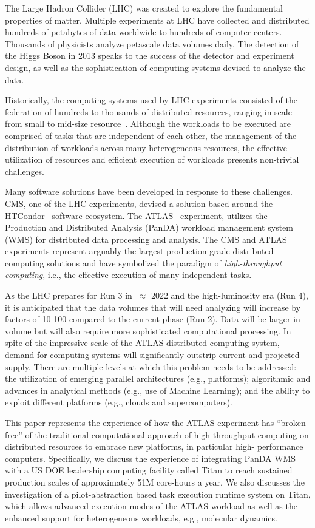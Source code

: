 The Large Hadron Collider (LHC) was created to explore the fundamental
properties of matter. Multiple experiments at LHC have
collected and distributed hundreds of petabytes of data worldwide to hundreds of
computer centers. Thousands of physicists analyze petascale data volumes daily.
The detection of the Higgs Boson in 2013 speaks to the success of the detector
and experiment design, as well as the sophistication of computing systems
devised to analyze the data.

Historically, the computing systems used by LHC experiments consisted of the
federation of hundreds to thousands of distributed resources, %
ranging in scale from small to mid-size resource~\cite{foster2003grid}. Although
the workloads to be executed are comprised of tasks that are independent of each
other, the management of the distribution of workloads across many heterogeneous
resources, the effective utilization of resources and efficient
execution of workloads presents non-trivial challenges.

Many software solutions have been developed in response to these challenges.
CMS, one of the LHC experiments, devised a solution based around the
HTCondor~\cite{thain2005distributed} software ecosystem. The
ATLAS~\cite{Aad:2008} experiment, utilizes the Production and Distributed
Analysis (PanDA) workload management system~\cite{Maeno2011} (WMS) for
distributed data processing and analysis. The CMS and ATLAS experiments
represent arguably the largest production grade distributed computing solutions
and have symbolized the paradigm of {\it high-throughput computing}, i.e., the
effective execution of many independent tasks.

As the LHC prepares for Run 3 in $~\approx$ 2022 and the high-luminosity era
(Run 4), it is anticipated that the data volumes that will need analyzing will
increase by factors of 10-100 compared to the current phase (Run 2). Data will
be larger in volume but will also require more sophisticated computational
processing. In spite of the impressive scale of the ATLAS distributed
computing system, demand for computing systems will significantly outstrip
current and projected supply.  There are multiple levels at which this problem
needs to be addressed: the utilization of emerging parallel architectures
(e.g., platforms); algorithmic and advances in analytical methods (e.g., use
of Machine Learning); and the ability to exploit different platforms (e.g.,
clouds and supercomputers).

This paper represents the experience of how the ATLAS experiment has ``broken
free'' of the traditional computational approach of high-throughput computing
on distributed resources to embrace new platforms, in particular  high-
performance computers. Specifically, we discuss the experience of integrating
PanDA WMS with a US DOE leadership computing facility called Titan to reach
sustained production scales of approximately 51M core-hours a year. We also
discusses the investigation of a pilot-abstraction based task execution
runtime system on Titan, which allows advanced execution modes of the ATLAS
workload as well as the enhanced support for heterogeneous workloads, 
e.g., molecular dynamics.

